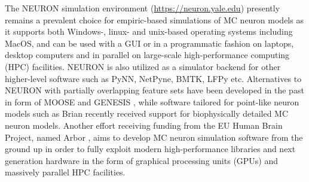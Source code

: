 The NEURON simulation environment \cite{Hines1997} (\href{https://neuron.yale.edu}{https://neuron.yale.edu}) presently remains a prevalent choice for empiric-based simulations of MC neuron models as it supports both Windows-, 
linux- and unix-based operating systems including MacOS, 
and can be used with a GUI or in a programmatic fashion on laptops, desktop computers and in parallel on large-scale high-performance computing (HPC) facilities. 
NEURON is also utilized as a simulator backend for other higher-level software such as PyNN, NetPyne, BMTK, LFPy  etc.
Alternatives to NEURON with partially overlapping feature sets have been developed in the past in form of MOOSE  and GENESIS , 
while software tailored for point-like neuron models such as Brian  recently received support for biophysically detailed MC neuron models.
Another effort receiving funding from the EU Human Brain Project, 
named Arbor , 
aims to develop MC neuron simulation software from the ground up in order to fully exploit modern high-performance libraries and next generation hardware in the form of graphical processing units (GPUs) and massively parallel HPC facilities. 

